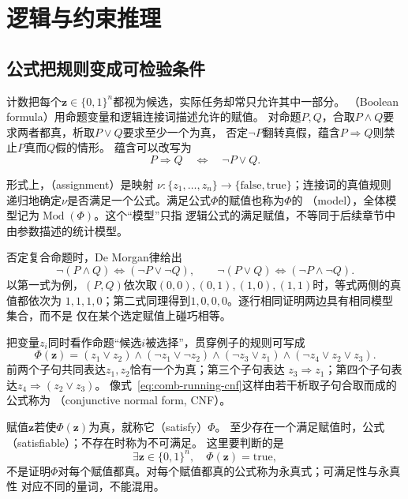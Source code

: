 \section{逻辑与约束推理}
\label{sec:comb-logic-constraints}

\subsection{公式把规则变成可检验条件}

计数把每个$\bm{z}\in\{0,1\}^n$都视为候选，实际任务却常只允许其中一部分。
（Boolean formula）用命题变量和逻辑连接词描述允许的赋值。
对命题$P,Q$，合取$P\land Q$要求两者都真，析取$P\lor Q$要求至少一个为真，
否定$\neg P$翻转真假，蕴含$P\Rightarrow Q$则禁止$P$真而$Q$假的情形。
蕴含可以改写为
\begin{equation}
  P\Rightarrow Q
  \quad\Longleftrightarrow\quad
  \neg P\lor Q.
  \label{eq:comb-implication-clause}
\end{equation}

形式上，（assignment）是映射
$\nu:\{z_1,\ldots,z_n\}\to\{\mathrm{false},\mathrm{true}\}$；连接词的真值规则
递归地确定$\nu$是否满足一个公式。满足公式$\Phi$的赋值也称为$\Phi$的
（model），全体模型记为$\operatorname{Mod}(\Phi)$。这个“模型”只指
逻辑公式的满足赋值，不等同于后续章节中由参数描述的统计模型。

否定复合命题时，De Morgan律给出
\begin{equation}
  \neg(P\land Q)\Longleftrightarrow(\neg P\lor\neg Q),
  \qquad
  \neg(P\lor Q)\Longleftrightarrow(\neg P\land\neg Q).
  \label{eq:comb-de-morgan}
\end{equation}
以第一式为例，$(P,Q)$依次取$(0,0),(0,1),(1,0),(1,1)$时，等式两侧的真值都依次为
$1,1,1,0$；第二式同理得到$1,0,0,0$。逐行相同证明两边具有相同模型集合，而不是
仅在某个选定赋值上碰巧相等。

把变量$z_i$同时看作命题“候选$i$被选择”，贯穿例子的规则可写成
\begin{equation}
  \Phi(\bm{z})
  =
  (z_1\lor z_2)
  \land(\neg z_1\lor\neg z_2)
  \land(\neg z_3\lor z_1)
  \land(\neg z_4\lor z_2\lor z_3).
  \label{eq:comb-running-cnf}
\end{equation}
前两个子句共同表达$z_1,z_2$恰有一个为真；第三个子句表达
$z_3\Rightarrow z_1$；第四个子句表达$z_4\Rightarrow(z_2\lor z_3)$。
像式~\eqref{eq:comb-running-cnf}这样由若干析取子句合取而成的公式称为
（conjunctive normal form, CNF）。

赋值$\bm{z}$若使$\Phi(\bm{z})$为真，就称它（satisfy）$\Phi$。
至少存在一个满足赋值时，公式（satisfiable）；不存在时称为不可满足。
这里要判断的是
\[
  \exists\bm{z}\in\{0,1\}^n,\quad \Phi(\bm{z})=\mathrm{true},
\]
不是证明$\Phi$对每个赋值都真。对每个赋值都真的公式称为永真式；可满足性与永真性
对应不同的量词，不能混用。

